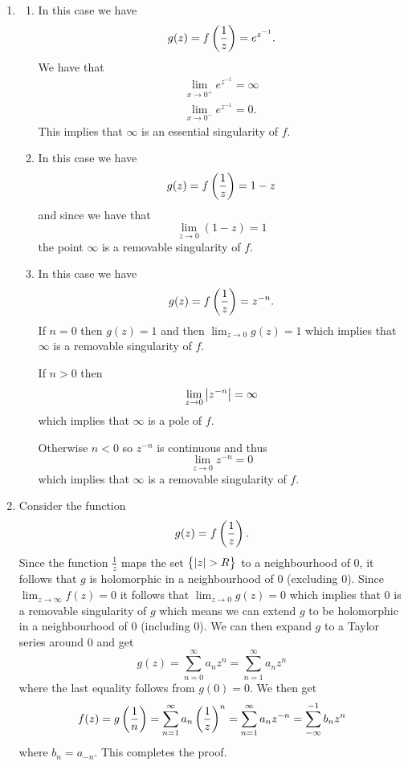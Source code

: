 \documentclass[11pt,a4paper]{article}
\begin{document}
\begin{solution} \phantom{}
\begin{enumerate}
  \item[(1)]
  \begin{enumerate}
    \item[(a)] In this case we have
      \[
        g(z) = f\del{\frac{1}{z}} = e^{z^{-1}}.
      \]
      We have that
      \begin{gather*}
        \lim_{x \to 0^+} e^{z^{-1}} = \infty \\
        \lim_{x \to 0^-} e^{z^{-1}} = 0.
      \end{gather*}
      This implies that $\infty$ is an essential singularity of $f$. 
    \item[(b)] In this case we have
      \[
        g(z) = f\del{\frac{1}{z}} = 1 - z
      \]
      and since we have that
      \[
        \lim_{z \to 0} (1 - z) = 1
      \]
      the point $\infty$ is a removable singularity of $f$.
    \item[(c)] In this case we have
      \[
        g(z) = f\del{\frac{1}{z}} = z^{-n}.
      \]
      If $n = 0$ then $g(z) = 1$ and then $\lim_{z \to 0} g(z) = 1$
      which implies that $\infty$ is a removable singularity of $f$.

      If $n > 0$ then
      \[
        \lim_{z \to 0} \left\lvert z^{-n}\right\rvert = \infty
      \]
      which implies that $\infty$ is a pole of $f$.

      Otherwise $n < 0$ so $z^{-n}$ is continuous and thus
      \[
        \lim_{z \to 0} z^{-n} = 0
      \]
      which implies that $\infty$ is a removable singularity of $f$.
  \end{enumerate}
  \item[(2)] Consider the function
    \[
      g(z) = f\del{\frac{1}{z}}.
    \]
    Since the function $\frac{1}{z}$ maps the set $\left\{|z| > R\right\}$ to a
    neighbourhood of $0$, it follows that $g$ is holomorphic in a
    neighbourhood of $0$ (excluding $0$).
    Since $\lim_{z \to \infty} f(z) = 0$ it follows that
    $\lim_{z \to 0} g(z) = 0$ which implies that $0$
    is a removable singularity of $g$ which means we can extend $g$ to
    be holomorphic in a neighbourhood of $0$ (including $0$).
    We can then expand $g$ to a Taylor series around $0$ and get
    \[
      g(z) =
      \sum_{n=0}^{\infty} a_n z^n =
      \sum_{n=1}^{\infty} a_n z^n
    \]
    where the last equality follows from $g(0) = 0$.
    We then get
    \[
      f(z) = g\del{\frac{1}{n}} =
      \sum_{n=1}^{\infty} a_n \del{\frac{1}{z}}^n =
      \sum_{n=1}^{\infty} a_n z^{-n} =
      \sum_{\ninfty}^{-1} b_{n} z^{n}
    \]
    where $b_n = a_{-n}$.
    This completes the proof.
\end{enumerate}
\end{solution}
\end{document}

